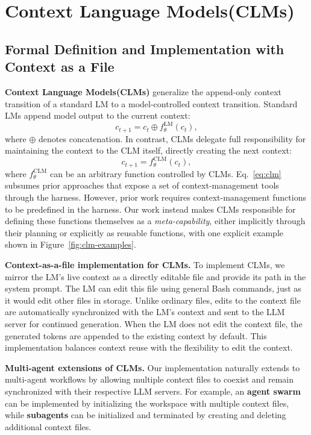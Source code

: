\documentclass{fairmeta}
\newcommand{\clmhl}[1]{\textcolor{clmblue}{\textbf{#1}}}
\newcommand{\ours}{CLM\xspace}
\newcommand{\oursplural}{CLMs\xspace}
\newcommand{\OURSplural}{Context Language Models\xspace}
\begin{document}
\section{\OURSplural (\oursplural)}\label{sec:method}

\subsection{Formal Definition and Implementation with Context as a File}

\clmhl{\OURSplural (\oursplural)} generalize the append-only context transition of a standard LM to a model-controlled context transition.
Standard LMs append model output to the current context:
\begin{equation}
c_{t+1} = c_t \oplus f^{\mathrm{LM}}_\theta(c_t),
\end{equation}
where \(\oplus\) denotes concatenation. 
In contrast, \oursplural delegate full responsibility for maintaining the context to the \ours itself, directly creating the next context:
\begin{equation}\label{eq:clm}
c_{t+1} = f^{\mathrm{CLM}}_\theta(c_t),
\end{equation}
where $f^{\mathrm{CLM}}_\theta$ can be an arbitrary function controlled by \oursplural.
Eq.~\ref{eq:clm} subsumes prior approaches that expose a set of context-management tools through the harness.
However, prior work requires context-management functions to be predefined in the harness. Our work instead makes \oursplural responsible for defining these functions themselves as a \textit{meta-capability}, either implicitly through their planning or explicitly as reusable functions, with one explicit example shown in Figure~\ref{fig:clm-examples}.

\textbf{\clmhl{Context-as-a-file} implementation for \oursplural.}
To implement CLMs, we mirror the LM's live context as a directly editable file and provide its path in the system prompt. 
The LM can edit this file using general Bash commands, just as it would edit other files in storage.
Unlike ordinary files, edits to the context file are automatically synchronized with the LM's context and sent to the LLM server for continued generation.
When the LM does not edit the context file, the generated tokens are appended to the existing context by default.
This implementation balances context reuse with the flexibility to edit the context.

\textbf{Multi-agent extensions of \oursplural.}
Our implementation naturally extends to multi-agent workflows by allowing multiple context files to coexist and remain synchronized with their respective LLM servers.
For example, an \clmhl{agent swarm} can be implemented by initializing the workspace with multiple context files, while \clmhl{subagents} can be initialized and terminated by creating and deleting additional context files.
\end{document}
